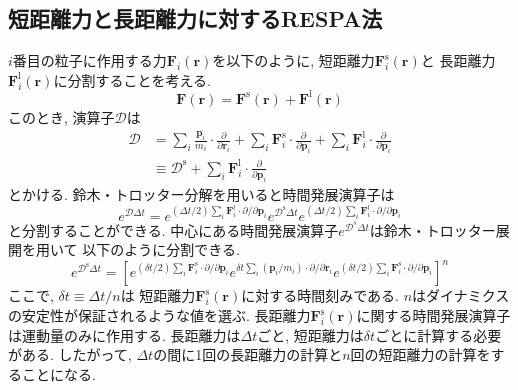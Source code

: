\subsection{短距離力と長距離力に対するRESPA法}
$i$番目の粒子に作用する力$\bm{F}_{i}(\bm{r})$を以下のように, 
短距離力$\bm{F}_{i}^{\mathrm{s}}(\bm{r})$と
長距離力$\bm{F}_{i}^{\mathrm{l}}(\bm{r})$に分割することを考える. 
\begin{equation}
 \bm{F}(\bm{r})
  = \bm{F}^{\mathrm{s}}(\bm{r})
  + \bm{F}^{\mathrm{l}}(\bm{r})
\end{equation}
このとき, 演算子$\mathcal{D}$は
\begin{align}
 \mathcal{D}
 &= \sum_{i} \frac{\bm{p}_{i}}{m_{i}}
    \cdot \frac{\partial}{\partial \bm{r}_{i}}
  + \sum_{i} \bm{F}^{\mathrm{s}}_{i} \cdot \frac{\partial}{\partial \bm{p}_{i}}
  + \sum_{i} \bm{F}^{\mathrm{l}}_{i} \cdot \frac{\partial}{\partial \bm{p}_{i}} \\
 &\equiv
    \mathcal{D}^{\mathrm{s}}  
  + \sum_{i} \bm{F}^{\mathrm{l}}_{i} \cdot \frac{\partial}{\partial \bm{p}_{i}}
\end{align}
とかける. 鈴木・トロッター分解を用いると時間発展演算子は
\begin{equation}
 e^{\mathcal{D}\Delta t}
  = e^{(\Delta t/2) \sum_{i} \bm{F}^{l}_{i} \cdot \partial/\partial \bm{p}_{i}}
    e^{\mathcal{D}^{\mathrm{s}} \Delta t}
    e^{(\Delta t/2) \sum_{i} \bm{F}^{l}_{i} \cdot \partial/\partial \bm{p}_{i}} 
 \label{eq:2.6}    
\end{equation}
と分割することができる. 
中心にある時間発展演算子$e^{\mathcal{D}^{s} \Delta t}$は鈴木・トロッター展開を用いて
以下のように分割できる. 
\begin{equation}
 e^{\mathcal{D}^{\mathrm{s}} \Delta t}
  = \left[
     e^{(\delta t/2) \sum_{i} \bm{F}^{\mathrm{s}}_{i} \cdot \partial/\partial \bm{p}_{i}}
     e^{\delta t \sum_{i} (\bm{p}_{i}/m_{i}) \cdot \partial/\partial \bm{r}_{i}}
     e^{(\delta t/2) \sum_{i} \bm{F}^{\mathrm{s}}_{i} \cdot \partial/\partial \bm{p}_{i}}
    \right]^{n}
 \label{eq:2.7}
\end{equation}
ここで, $\delta t \equiv \Delta t / n$は
短距離力$\bm{F}_{i}^{\mathrm{s}}(\bm{r})$に対する時間刻みである. 
$n$はダイナミクスの安定性が保証されるような値を選ぶ. 
長距離力$\bm{F}_{i}^{\mathrm{s}}(\bm{r})$に関する時間発展演算子は運動量のみに作用する. 
長距離力は$\Delta t$ごと, 短距離力は$\delta t$ごとに計算する必要がある. 
したがって, $\Delta t$の間に1回の長距離力の計算と$n$回の短距離力の計算をすることになる. 

